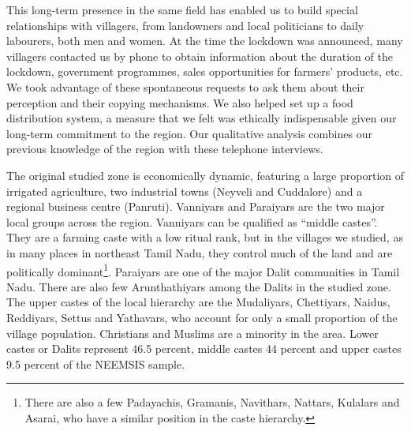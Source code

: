 \documentclass[a4paper, 11pt, onecolumn]{article}
\begin{document}
This long-term presence in the same field has enabled us to build special relationships with villagers, from landowners and local politicians to daily labourers, both men and women. 
At the time the lockdown was announced, many villagers contacted us by phone to obtain information about the duration of the lockdown, government programmes, sales opportunities for farmers' products, etc.
We took advantage of these spontaneous requests to ask them about their perception and their copying mechanisms. 
We also helped set up a food distribution system, a measure that we felt was ethically indispensable given our long-term commitment to the region. 
Our qualitative analysis combines our previous knowledge of the region with these telephone interviews. 

The original studied zone is economically dynamic, featuring a large proportion of irrigated agriculture, two industrial towns (Neyveli and Cuddalore) and a regional business centre (Panruti). 
Vanniyars and Paraiyars are the two major local groups across the region. 
Vanniyars can be qualified as “middle castes”. 
They are a farming caste with a low ritual rank, but in the villages we studied, as in many places in northeast Tamil Nadu, they control much of the land and are politically dominant\footnote{There are also a few Padayachis, Gramanis, Navithars, Nattars, Kulalars and Asarai, who have a similar position in the caste hierarchy.}. 
Paraiyars are one of the major Dalit communities in Tamil Nadu. 
There are also few Arunthathiyars among the Dalits in the studied zone. 
The upper castes of the local hierarchy are the Mudaliyars, Chettiyars, Naidus, Reddiyars, Settus and Yathavars, who account for only a small proportion of the village population. 
Christians and Muslims are a minority in the area. 
Lower castes or Dalits represent 46.5 percent, middle castes 44 percent and upper castes 9.5 percent of the NEEMSIS sample.
\end{document}
